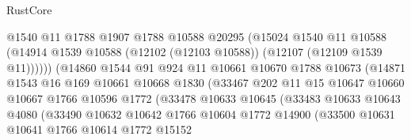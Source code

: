 \begin{lexlean}{RustCore}
\begin{coremodule}
                                @1540
                                @11
                                @1788
                                @1907
                                @1788
                                @10588
                                @20295
                                (@15024
                                  @1540
                                  @11
                                  @10588
                                  (@14914
                                    @1539
                                    @10588
                                    (@12102 (@12103 @10588))
                                    (@12107 (@12109 @1539 @11))))))
                            (@14860
                              @1544
                              @91
                              @924
                              @11
                              @10661
                              @10670
                              @1788
                              @10673
                              (@14871
                                @1543
                                @16
                                @169
                                @10661
                                @10668
                                @1830
                                (@33467
                                  @202
                                  @11
                                  @15
                                  @10647
                                  @10660
                                  @10667
                                  @1766
                                  @10596
                                  @1772
                                  (@33478
                                    @10633
                                    @10645
                                    (@33483
                                      @10633
                                      @10643
                                      @4080
                                      (@33490
                                        @10632
                                        @10642
                                        @1766
                                        @10604
                                        @1772
                                        @14900
                                        (@33500
                                          @10631
                                          @10641
                                          @1766
                                          @10614
                                          @1772
                                          @15152

\end{coremodule}
\end{lexlean}
